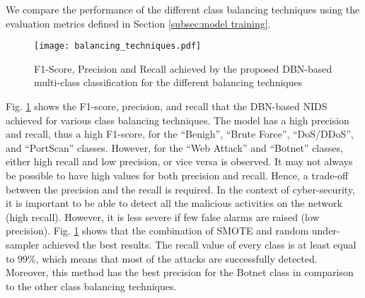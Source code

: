 \documentclass[runningheads]{llncs}
\begin{document}
We compare the performance of the different class balancing techniques using the evaluation metrics defined in Section \ref{subsec:model training}.

\begin{figure}[ht]
    \centering
    \texttt{[image: balancing\_techniques.pdf]}
    \caption{F1-Score, Precision and Recall achieved by the proposed \ac{DBN}-based multi-class classification for the different balancing techniques}
    \label{fig:balancing_techniques_eval}
\end{figure}

Fig. \ref{fig:balancing_techniques_eval} shows the F1-score, precision, and recall that the \ac{DBN}-based NIDS achieved for various class balancing techniques. The model has a high precision and recall, thus a high F1-score, for the ``Benigh'', ``Brute Force'', ``DoS/DDoS'', and ``PortScan'' classes. However, for the ``Web Attack'' and ``Botnet'' classes, either high recall and low precision, or vice versa is observed. It may not always be possible to have high values for both precision and recall. Hence, a trade-off between the precision and the recall is required. In the context of cyber-security, it is important to be able to detect all the malicious activities on the network (high recall). However, it is less severe if few false alarms are raised (low precision). Fig. \ref{fig:balancing_techniques_eval} shows that the combination of \ac{SMOTE} and random under-sampler achieved the best results. The recall value of every class is at least equal to $99$\%, which means that most of the attacks are successfully detected. Moreover, this method has the best precision for the Botnet class in comparison to the other class balancing techniques.
\end{document}
